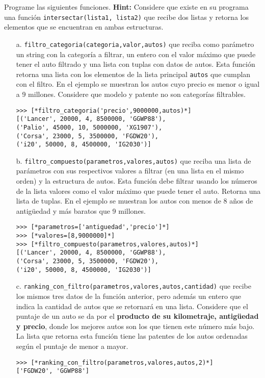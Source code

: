 Programe las siguientes funciones. \textbf{Hint:} Considere que existe en su programa una función \texttt{intersectar(lista1, lista2)} que recibe  dos listas y retorna los elementos que se encuentran en ambas estructuras. 
\begin{itemize}  
    \item[a.] \texttt{filtro\_categoria(categoria,valor,autos)} que reciba como parámetro un string con la categoría a filtrar, un entero con el valor máximo que puede tener el auto filtrado y una lista con tuplas con datos de autos. Esta función retorna una lista con los elementos de la lista principal \texttt{autos} que cumplan con el filtro. En el ejemplo se muestran los autos cuyo precio es menor o igual a 9 millones. Considere que modelo y patente no son categorías filtrables.
    
\begin{lstlisting}[style=consola]
>>> [*filtro_categoria('precio',9000000,autos)*]
[('Lancer', 20000, 4, 8500000, 'GGWP88'), 
('Palio', 45000, 10, 5000000, 'XG1907'), 
('Corsa', 23000, 5, 3500000, 'FGDW20'), 
('i20', 50000, 8, 4500000, 'IG2030')]
\end{lstlisting}

    \item[b.] \texttt{filtro\_compuesto(parametros,valores,autos)} que reciba una lista de parámetros con sus respectivos valores a filtrar (en una lista en el mismo orden) y la estructura de autos. Esta función debe filtrar usando los números de la lista valores como el valor máximo que puede tener el auto. Retorna una lista de tuplas. En el ejemplo se muestran los autos con menos de 8 años de antigüedad y más baratos que 9 millones.
    
\begin{lstlisting}[style=consola]
>>> [*parametros=['antiguedad','precio']*]
>>> [*valores=[8,9000000]*]
>>> [*filtro_compuesto(parametros,valores,autos)*]
[('Lancer', 20000, 4, 8500000, 'GGWP88'), 
('Corsa', 23000, 5, 3500000, 'FGDW20'), 
('i20', 50000, 8, 4500000, 'IG2030')]
\end{lstlisting}

    \item[c.] \texttt{ranking\_con\_filtro(parametros,valores,autos,cantidad)} que recibe los mismos tres datos de la función anterior, pero además un entero que indica la cantidad de autos que se retornará en una lista. Considere que el puntaje de un auto se da por el \textbf{producto de su kilometraje, antigüedad y precio}, donde los mejores autos son los que tienen este número más bajo. La lista que retorna esta función tiene las patentes de los autos ordenadas según el puntaje de menor a mayor.

\begin{lstlisting}[style=consola]
>>> [*ranking_con_filtro(parametros,valores,autos,2)*]
['FGDW20', 'GGWP88']
\end{lstlisting}    
\end{itemize}